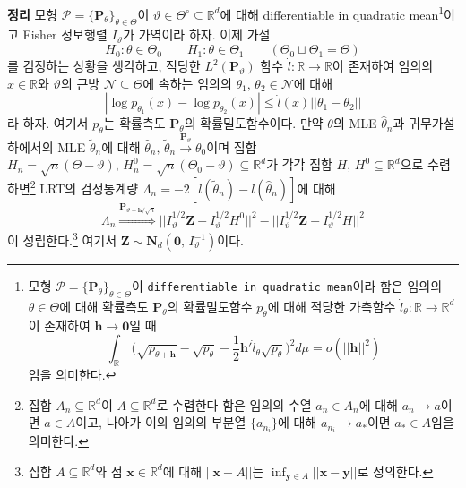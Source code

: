 \documentclass[10pt,onecolumn,twoside,a4size]{gsag3jnl}
\begin{document}
\noindent\textsf{\textbf{정리} 모형 $\mathcal{P}=\{\mathbf{P}_\theta\}_{\theta\in\Theta}$이 $\vartheta\in\Theta^\circ\subseteq\mathbb{R}^d$에 대해 differentiable in quadratic mean\footnote{모형 $\mathcal{P}=\{\mathbf{P}_\theta\}_{\theta\in\Theta}$이 \texttt{differentiable in quadratic mean}이라 함은 임의의 $\theta\in\Theta$에 대해 확률측도 $\mathbf{P}_\theta$의 확률밀도함수 $p_\theta$에 대해 적당한 가측함수 $\dot{l}_\theta:\mathbb{R}\to\mathbb{R}^d$이 존재하여 $\mathbf{h}\to\mathbf{0}$일 때
\begin{equation}
  \int_{\mathbb{R}}\,\bigg(\sqrt{p_{\theta+\mathbf{h}}}-\sqrt{p_{\theta}}-\frac{1}{2}\mathbf{h}'\dot{l}_\theta\sqrt{p_\theta}\bigg)^2d\mu=o(||\mathbf{h}||^2)
\end{equation}
임을 의미한다.}이고 Fisher 정보행렬 $I_{\vartheta}$가 가역이라 하자. 이제 가설
\begin{equation}
  H_0:\theta\in\Theta_0\qquad H_1:\theta\in\Theta_1\qquad(\Theta_0\sqcup\Theta_1=\Theta)
\end{equation}
를 검정하는 상황을 생각하고, 적당한 $L^2(\mathbf{P}_{\vartheta})$ 함수 $\dot{l}:\mathbb{R}\to\mathbb{R}$이 존재하여 임의의 $x\in\mathbb{R}$와 $\vartheta$의 근방 $\mathcal{N}\subseteq\Theta$에 속하는 임의의 $\theta_1,\,\theta_2\in\mathcal{N}$에 대해
\begin{equation}
  |\log p_{\theta_1}(x)-\log p_{\theta_2}(x)|\leq\dot{l}(x)||\theta_1-\theta_2||
\end{equation}
라 하자. 여기서 $p_\theta$는 확률측도 $\mathbf{P}_\theta$의 확률밀도함수이다. 만약 $\theta$의 MLE $\widehat{\theta}_n$과 귀무가설 하에서의 MLE $\widetilde{\theta}_n$에 대해 $\widehat{\theta}_n,\,\widetilde{\theta}_n\stackrel{\mathbf{P}_{\vartheta}}{\to}\theta_0$이며 집합 $H_n=\sqrt{n}(\Theta-\vartheta),\,H_n^0=\sqrt{n}(\Theta_0-\vartheta)\subseteq\mathbb{R}^d$가 각각 집합 $H,\,H^0\subseteq\mathbb{R}^d$으로 수렴하면\footnote{집합 $A_n\subseteq\mathbb{R}^d$이 $A\subseteq\mathbb{R}^d$로 수렴한다 함은 임의의 수열 $a_n\in A_n$에 대해 $a_n\to a$이면 $a\in A$이고, 나아가 이의 임의의 부분열 $\{a_{n_i}\}$에 대해 $a_{n_i}\to a_*$이면 $a_*\in A$임을 의미한다.} LRT의 검정통계량 $\Lambda_n=-2[l(\widetilde{\theta}_n)-l(\widehat{\theta}_n)]$에 대해
\begin{equation}
  \Lambda_n\stackrel{\mathbf{P}_{\vartheta+\mathbf{h}/\sqrt{n}}}{\Rightarrow}||I_{\vartheta}^{1/2}\mathbf{Z}-I_{\vartheta}^{1/2}H^0||^2-||I_{\vartheta}^{1/2}\mathbf{Z}-I_{\vartheta}^{1/2}H||^2
\end{equation}
이 성립한다.\footnote{집합 $A\subseteq\mathbb{R}^d$와 점 $\mathbf{x}\in\mathbb{R}^d$에 대해 $||\mathbf{x}-A||$는 $\inf_{\mathbf{y}\in A}||\mathbf{x}-\mathbf{y}||$로 정의한다.} 여기서 $\mathbf{Z}\sim\mathbf{N}_d(\mathbf{0},\,I_\vartheta^{-1})$이다.}
\end{document}
